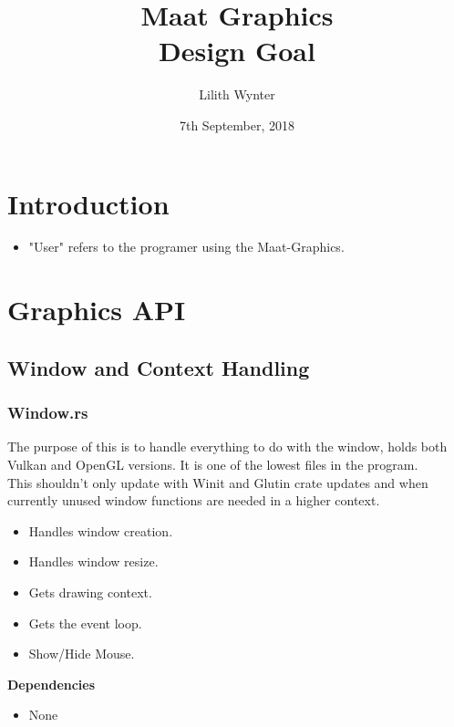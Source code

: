 \documentclass[12pt,a4paper]{article}
\title{\textbf{Maat Graphics\\ Design Goal }\\ \large }
\author{Lilith Wynter}
\date{7th September, 2018}
\begin{document}
\maketitle

\thispagestyle{empty}







\newpage
\tableofcontents

\newpage
\section{Introduction}
\begin{itemize}
\item "User" refers to the programer using the Maat-Graphics.
\end{itemize}
\section{Graphics API}
\subsection{Window and Context Handling}
\subsubsection{Window.rs}
The purpose of this is to handle everything to do with the window, holds both Vulkan and OpenGL versions. It is one of the lowest files in the program.
\\
This shouldn't only update with Winit and Glutin crate updates and when currently unused window functions are needed in a higher context.
\begin{itemize}
\item Handles window creation.
\item Handles window resize.
\item Gets drawing context.
\item Gets the event loop.
\item Show/Hide Mouse.
\end{itemize}
\textbf{Dependencies}
\begin{itemize}
\item None
\end{itemize}
\end{document}
